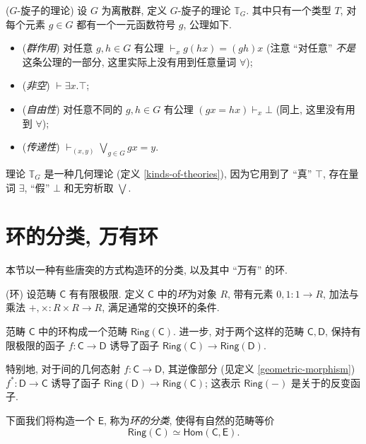 \begin{definition}
	{($G$-旋子的理论)}
	设 $G$ 为离散群, 定义 $G$-旋子的理论 $\mathbb T_G$.
	其中只有一个类型 $T$, 对每个元素 $g\in G$ 都有一个一元函数符号 $g$, 公理如下.
	\begin{itemize}
		\item (\emph{群作用}) 对任意 $g,h\in G$ 有公理 $\vdash_x g(hx)=(gh)x$ (注意 ``对任意'' \emph{不是}这条公理的一部分, 这里实际上没有用到任意量词 $\forall$);
		\item (\emph{非空}) $\vdash \exists x. \top$;
		\item (\emph{自由性}) 对任意不同的 $g,h\in G$ 有公理 $(gx=hx)\vdash_x \bot$ (同上, 这里没有用到 $\forall$);
		\item (\emph{传递性}) $\displaystyle\vdash_{(x,y)}\bigvee_{g\in G}gx=y$.
	\end{itemize}
\end{definition}

理论 $\mathbb T_G$ 是一种几何理论 (定义 \ref{kinds-of-theories}), 因为它用到了 ``真'' $\top$, 存在量词 $\exists$, ``假'' $\bot$ 和无穷析取 $\bigvee$.

\section{环的分类\topos{}, 万有环}

本节以一种有些唐突的方式构造环的分类\topos{}, 以及其中 ``万有'' 的环. %

\begin{definition}
    {(环)}
    设范畴 $\mathsf C$ 有有限极限.
    定义 $\mathsf C$ 中的\emph{环}为对象 $R$,
    带有元素 $0,1\colon 1 \to R$,
    加法与乘法 $+,\times \colon R\times R \to R$,
    满足通常的交换环的条件.

    范畴 $\mathsf C$ 中的环构成一个范畴 $\mathsf {Ring}(\mathsf C)$.
    进一步, 对于两个这样的范畴 $\mathsf C,\mathsf D$, 保持有限极限的函子 $f \colon \mathsf C \to \mathsf D$ 诱导了函子
    $\mathsf {Ring}(\mathsf C) \to \mathsf {Ring}(\mathsf D)$.

    特别地, 对于\topos{}间的几何态射 $f \colon \mathsf C \to \mathsf D$, 其逆像部分 (见定义 \ref{geometric-morphism}) $f^* \colon \mathsf D \to \mathsf C$ 诱导了函子 $\mathsf {Ring}(\mathsf D) \to \mathsf {Ring}(\mathsf C)$;
    这表示 $\mathsf {Ring}(-)$ 是关于\topos{}的反变函子.
\end{definition}

下面我们将构造一个\topos{} $\mathsf E$, 称为\emph{环的分类\topos{}}, 使得有自然的范畴等价
$$
\mathsf {Ring}(\mathsf C) \simeq \mathsf{Hom}(\mathsf C,\mathsf E).
$$

